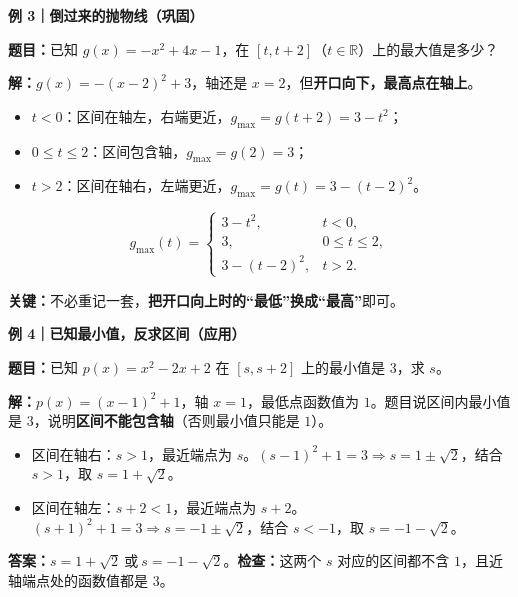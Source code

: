 \begin{examplebox}
\medskip
\textbf{\textcolor{CExample}{例 3｜倒过来的抛物线（巩固）}}

\textbf{题目：}已知 $g(x)=-x^2+4x-1$，在 $[t,t+2]$（$t\in\mathbb R$）上的最大值是多少？

\textbf{解：}$g(x)=-(x-2)^2+3$，轴还是 $x=2$，但\textbf{开口向下，最高点在轴上}。
\begin{itemize}[leftmargin=*,itemsep=0.23em]
 \item $t<0$：区间在轴左，右端更近，$g_{\max}=g(t+2)=3-t^2$；
 \item $0\le t\le2$：区间包含轴，$g_{\max}=g(2)=3$；
 \item $t>2$：区间在轴右，左端更近，$g_{\max}=g(t)=3-(t-2)^2$。
\end{itemize}
\[
 \boxed{g_{\max}(t)=
 \begin{cases}
 3-t^2,&t<0,\\ 3,&0\le t\le2,\\ 3-(t-2)^2,&t>2.
 \end{cases}}
\]
\begin{center}

\end{center}
\textbf{关键：}不必重记一套，\textbf{把开口向上时的“最低”换成“最高”}即可。

\medskip
\textbf{\textcolor{CExample}{例 4｜已知最小值，反求区间（应用）}}

\textbf{题目：}已知 $p(x)=x^2-2x+2$ 在 $[s,s+2]$ 上的最小值是 $3$，求 $s$。

\textbf{解：}$p(x)=(x-1)^2+1$，轴 $x=1$，最低点函数值为 $1$。题目说区间内最小值是 $3$，说明\textbf{区间不能包含轴}（否则最小值只能是 $1$）。
\begin{itemize}[leftmargin=*,itemsep=0.25em]
 \item 区间在轴右：$s>1$，最近端点为 $s$。$(s-1)^2+1=3\Rightarrow s=1\pm\sqrt2$，结合 $s>1$，取 $s=1+\sqrt2$。
 \item 区间在轴左：$s+2<1$，最近端点为 $s+2$。$(s+1)^2+1=3\Rightarrow s=-1\pm\sqrt2$，结合 $s<-1$，取 $s=-1-\sqrt2$。
\end{itemize}
\begin{center}

\end{center}
\textbf{答案：}$\boxed{s=1+\sqrt2\ \text{或}\ s=-1-\sqrt2}$。\textbf{检查：}这两个 $s$ 对应的区间都不含 $1$，且近轴端点处的函数值都是 $3$。
\end{examplebox}
